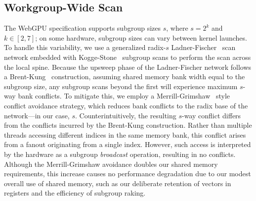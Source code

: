 \documentclass[sigconf,screen]{acmart}
\begin{document}
\subsection{Workgroup-Wide Scan}
The WebGPU specification supports subgroup sizes $s$, where $s = 2^k$ and $k \in [2, 7]$; on some hardware, subgroup sizes can vary between kernel launches. To handle this variability, we use a generalized radix-$s$ Ladner-Fischer~\cite{10.1145/322217.322232} scan network embedded with Kogge-Stone~\cite{5009159} subgroup scans to perform the scan across the local spine. Because the upsweep phase of the Ladner-Fischer network follows a Brent-Kung~\cite{1675982} construction, assuming shared memory bank width equal to the subgroup size, any subgroup scans beyond the first will experience maximum $s$-way bank conflicts. To mitigate this, we employ a Merrill-Grimshaw~\cite[Section 3.3.5]{Merrill2009} style conflict avoidance strategy, which reduces bank conflicts to the radix base of the network---in our case, $s$. Counterintuitively, the resulting $s$-way conflict differs from the conflicts incurred by the Brent-Kung construction. Rather than multiple threads accessing different indices in the same memory bank, this conflict arises from a fanout originating from a single index. However, such access is interpreted by the hardware as a subgroup \emph{broadcast} operation, resulting in no conflicts. Although the Merrill-Grimshaw avoidance doubles our shared memory requirements, this increase causes no performance degradation due to our modest overall use of shared memory, such as our deliberate retention of vectors in registers and the efficiency of subgroup raking.
\end{document}
